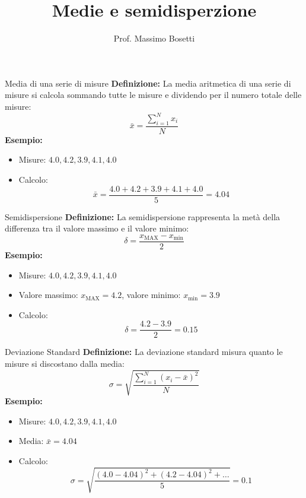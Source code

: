 \documentclass[9pt]{beamer}
\title{Medie e semidisperzione}
\subtitle{}
\author{Prof. Massimo Bosetti}
\institute{Liceo da Vinci}
\date{}
\begin{document}
\frame{\titlepage}
\begin{frame}{Media di una serie di misure}
\textbf{Definizione:} La media aritmetica di una serie di misure si calcola sommando tutte le misure e dividendo per il numero totale delle misure:
$$
\bar{x} = \frac{\sum_{i=1}^N x_i}{N}
$$
\textbf{Esempio:}
\begin{itemize}
    \item Misure: $ 4.0, 4.2, 3.9, 4.1, 4.0 $
    \item Calcolo:
    $$
    \bar{x} = \frac{4.0 + 4.2 + 3.9 + 4.1 + 4.0}{5} = 4.04
    $$
\end{itemize}
\end{frame}

\begin{frame}{Semidispersione}
\textbf{Definizione:} La semidispersione rappresenta la metà della differenza tra il valore massimo e il valore minimo:
$$
\delta = \frac{x_{\text{MAX}} - x_{\text{min}}}{2}
$$
\textbf{Esempio:}
\begin{itemize}
    \item Misure: $ 4.0, 4.2, 3.9, 4.1, 4.0 $
    \item Valore massimo: $ x_{\text{MAX}} = 4.2 $, valore minimo: $ x_{\text{min}} = 3.9 $
    \item Calcolo:
    $$
    \delta = \frac{4.2 - 3.9}{2} = 0.15
    $$
\end{itemize}
\end{frame}

\begin{frame}{Deviazione Standard}
\textbf{Definizione:} La deviazione standard misura quanto le misure si discostano dalla media:
$$
\sigma = \sqrt{\frac{\sum_{i=1}^N (x_i - \bar{x})^2}{N}}
$$
\textbf{Esempio:}
\begin{itemize}
    \item Misure: $ 4.0, 4.2, 3.9, 4.1, 4.0 $
    \item Media: $ \bar{x} = 4.04 $
    \item Calcolo:
    $$
    \sigma = \sqrt{\frac{(4.0 - 4.04)^2 + (4.2 - 4.04)^2 + \dots}{5}} = 0.1
    $$
\end{itemize}
\end{frame}
\end{document}
